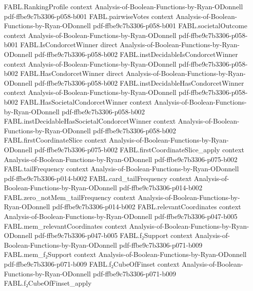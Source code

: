 \begin{theorem}
\proofstep
  {FABL.RankingProfile}
  {context}
  {Analysis-of-Boolean-Functions-by-Ryan-ODonnell}
  {pdf-ffbe9c7b3306-p058-b001}
\proofstep
  {FABL.pairwiseVotes}
  {context}
  {Analysis-of-Boolean-Functions-by-Ryan-ODonnell}
  {pdf-ffbe9c7b3306-p058-b001}
\proofstep
  {FABL.societalOutcome}
  {context}
  {Analysis-of-Boolean-Functions-by-Ryan-ODonnell}
  {pdf-ffbe9c7b3306-p058-b001}
\proofstep
  {FABL.IsCondorcetWinner}
  {direct}
  {Analysis-of-Boolean-Functions-by-Ryan-ODonnell}
  {pdf-ffbe9c7b3306-p058-b002}
\proofstep
  {FABL.instDecidableIsCondorcetWinner}
  {context}
  {Analysis-of-Boolean-Functions-by-Ryan-ODonnell}
  {pdf-ffbe9c7b3306-p058-b002}
\proofstep
  {FABL.HasCondorcetWinner}
  {direct}
  {Analysis-of-Boolean-Functions-by-Ryan-ODonnell}
  {pdf-ffbe9c7b3306-p058-b002}
\proofstep
  {FABL.instDecidableHasCondorcetWinner}
  {context}
  {Analysis-of-Boolean-Functions-by-Ryan-ODonnell}
  {pdf-ffbe9c7b3306-p058-b002}
\proofstep
  {FABL.HasSocietalCondorcetWinner}
  {context}
  {Analysis-of-Boolean-Functions-by-Ryan-ODonnell}
  {pdf-ffbe9c7b3306-p058-b002}
\proofstep
  {FABL.instDecidableHasSocietalCondorcetWinner}
  {context}
  {Analysis-of-Boolean-Functions-by-Ryan-ODonnell}
  {pdf-ffbe9c7b3306-p058-b002}
\proofstep
  {FABL.firstCoordinateSlice}
  {context}
  {Analysis-of-Boolean-Functions-by-Ryan-ODonnell}
  {pdf-ffbe9c7b3306-p075-b002}
\proofstep
  {FABL.firstCoordinateSlice_apply}
  {context}
  {Analysis-of-Boolean-Functions-by-Ryan-ODonnell}
  {pdf-ffbe9c7b3306-p075-b002}
\proofstep
  {FABL.tailFrequency}
  {context}
  {Analysis-of-Boolean-Functions-by-Ryan-ODonnell}
  {pdf-ffbe9c7b3306-p014-b002}
\proofstep
  {FABL.card_tailFrequency}
  {context}
  {Analysis-of-Boolean-Functions-by-Ryan-ODonnell}
  {pdf-ffbe9c7b3306-p014-b002}
\proofstep
  {FABL.zero_notMem_tailFrequency}
  {context}
  {Analysis-of-Boolean-Functions-by-Ryan-ODonnell}
  {pdf-ffbe9c7b3306-p014-b002}
\proofstep
  {FABL.relevantCoordinates}
  {context}
  {Analysis-of-Boolean-Functions-by-Ryan-ODonnell}
  {pdf-ffbe9c7b3306-p047-b005}
\proofstep
  {FABL.mem_relevantCoordinates}
  {context}
  {Analysis-of-Boolean-Functions-by-Ryan-ODonnell}
  {pdf-ffbe9c7b3306-p047-b005}
\proofstep
  {FABL.f₂Support}
  {context}
  {Analysis-of-Boolean-Functions-by-Ryan-ODonnell}
  {pdf-ffbe9c7b3306-p071-b009}
\proofstep
  {FABL.mem_f₂Support}
  {context}
  {Analysis-of-Boolean-Functions-by-Ryan-ODonnell}
  {pdf-ffbe9c7b3306-p071-b009}
\proofstep
  {FABL.f₂CubeOfFinset}
  {context}
  {Analysis-of-Boolean-Functions-by-Ryan-ODonnell}
  {pdf-ffbe9c7b3306-p071-b009}
\proofstep
  {FABL.f₂CubeOfFinset_apply}

\end{theorem}
